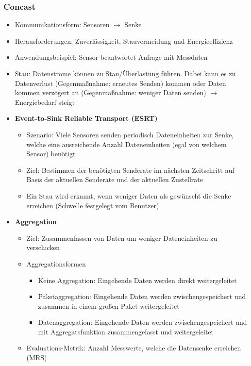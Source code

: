 \subsubsection{Concast}
\begin{itemize}
	\item Kommunikationsform: Sensoren \(\rightarrow\) Senke
	\item Herausforderungen: Zuverlässigkeit, Stauvermeidung und Energieeffizienz
	\item Anwendungsbeispiel: Sensor beantwortet Anfrage mit Messdaten
	\item Stau: Datenströme können zu Stau/Überlastung führen. Dabei kann es zu Datenverlust (Gegenmaßnahme: erneutes Senden) kommen oder Daten kommen verzögert an (Gegenmaßnahme: weniger Daten senden) \(\rightarrow\) Energiebedarf steigt
	\item \textbf{Event-to-Sink Reliable Transport (ESRT)}
	\begin{itemize}
		\item Szenario: Viele Sensoren senden periodisch Dateneinheiten zur Senke, welche eine ausreichende Anzahl Dateneinheiten (egal von welchem Sensor) benötigt
		\item Ziel: Bestimmen der benötigten Senderate im nächsten Zeitschritt auf Basis der aktuellen Senderate und der aktuellen Zustellrate
		\item Ein Stau wird erkannt, wenn weniger Daten als gewünscht die Senke erreichen (Schwelle festgelegt vom Benutzer)
	\end{itemize}
	\item \textbf{Aggregation}
	\begin{itemize}
		\item Ziel: Zusammenfassen von Daten um weniger Dateneinheiten zu verschicken
		\item Aggregationsformen
		\begin{itemize}
			\item Keine Aggregation: Eingehende Daten werden direkt weitergeleitet
			\item Paketaggregation: Eingehende Daten werden zwischengespeichert und zusammen in einem großen Paket weitergeleitet
			\item Datenaggregation: Eingehende Daten werden zwischengespeichert und mit Aggregatsfunktion zusammengefasst und weitergeleitet
		\end{itemize}
		\item Evaluations-Metrik: Anzahl Messwerte, welche die Datensenke erreichen (MRS)
		\begin{itemize}

\end{itemize}
\end{itemize}
\end{itemize}
